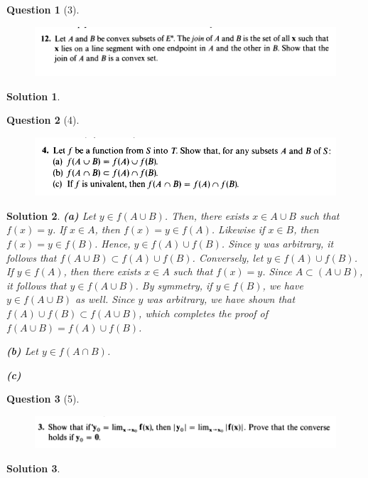 \documentclass{article} %
\theoremstyle{quest}
\newtheorem*{question}{Question}
\newtheorem*{solution}{Solution}
\begin{document}
\bigskip

\begin{question}[3]
\hfill
\begin{figure}[h!]
  \centering
    \includegraphics[width=1\textwidth]{MV-1-5-12.png}
\end{figure}
\end{question}
\begin{solution}
\end{solution}
\bigskip

\begin{question}[4]
\hfill
\begin{figure}[h!]
  \centering
    \includegraphics[width=1\textwidth]{MV-2-1-4.png}
\end{figure}
\end{question}
\begin{solution}
\textbf{(a)}
Let $y \in f(A \cup B)$. Then, there exists $x \in A \cup B$ such that $f(x) = y$. 
If $x \in A$, then $f(x) = y \in f(A)$. Likewise if $x \in B$, then $f(x) = y \in f(B)$. Hence,
$y \in f(A) \cup f(B)$. Since $y$ was arbitrary, it follows that $f(A \cup B) \subset 
f(A) \cup f(B)$. Conversely, let $y \in f(A) \cup f(B)$. If $y \in f(A)$, then there 
exists $x \in A$ such that $f(x) = y$. Since $A \subset (A \cup B)$, it follows that 
$y \in f(A \cup B)$. By symmetry, if $y \in f(B)$, we have $y \in f(A \cup B)$ as well.
Since $y$ was arbitrary, we have shown that $f(A) \cup f(B) \subset f(A \cup B)$, which completes
the proof of $f(A \cup B) = f(A) \cup f(B)$.  

\bigskip

\textbf{(b)} Let $y \in f(A \cap B)$. 

\bigskip

\textbf{(c)}  
  
\end{solution}

\pagebreak

\begin{question}[5]
\hfill
\begin{figure}[h!]
  \centering
    \includegraphics[width=1\textwidth]{MV-2-2-3.png}
\end{figure}
\end{question}
\begin{solution} 

 
\end{solution}

\pagebreak
\end{document}
